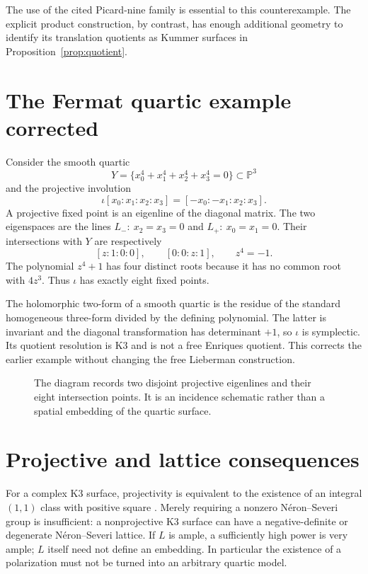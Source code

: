 \documentclass[11pt]{amsart}
\theoremstyle{definition}
\begin{document}
The use of the cited Picard-nine family is essential to this
counterexample. The explicit product construction, by contrast, has
enough additional geometry to identify its translation quotients as
Kummer surfaces in Proposition~\ref{prop:quotient}.

\section{The Fermat quartic example corrected}\label{sec:fermat}
Consider the smooth quartic
\[
 Y=\{x_0^4+x_1^4+x_2^4+x_3^4=0\}\subset\mathbb P^3
\]
and the projective involution
\[
 \iota[x_0:x_1:x_2:x_3]=[-x_0:-x_1:x_2:x_3].
\]
A projective fixed point is an eigenline of the diagonal matrix.
The two eigenspaces are the lines
$L_-:\ x_2=x_3=0$ and $L_+:\ x_0=x_1=0$.
Their intersections with $Y$ are respectively
\[
 [z:1:0:0],\qquad[0:0:z:1],\qquad z^4=-1.
\]
The polynomial $z^4+1$ has four distinct roots because it has no
common root with $4z^3$. Thus $\iota$ has exactly eight fixed points.

The holomorphic two-form of a smooth quartic is the residue of the
standard homogeneous three-form divided by the defining polynomial.
The latter is invariant and the diagonal transformation has determinant
$+1$, so $\iota$ is symplectic. Its quotient resolution is K3 and is
not a free Enriques quotient. This corrects the earlier example
without changing the free Lieberman construction.

\begin{figure}[tb]
\centering
{}
\caption{The diagram records two disjoint projective eigenlines and
their eight intersection points. It is an incidence schematic rather
than a spatial embedding of the quartic surface.}
\end{figure}

\section{Projective and lattice consequences}
For a complex K3 surface, projectivity is equivalent to the existence
of an integral $(1,1)$ class with positive square
\cite{Huybrechts}. Merely requiring a nonzero N\'eron--Severi group
is insufficient: a nonprojective K3 surface can have a negative-definite
or degenerate N\'eron--Severi lattice.
If $L$ is ample, a sufficiently high power is very ample; $L$ itself
need not define an embedding. In particular the existence of a
polarization must not be turned into an arbitrary quartic model.
\end{document}

